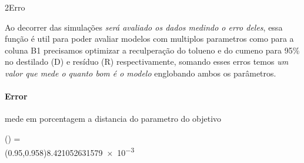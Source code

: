 \documentclass[\mainfilename]{subfiles}
\begin{document}
\begin{sectionBox}2{Erro} %
    
    Ao decorrer das simulações \emph{será avaliado os dados medindo o erro deles}, essa função é util para poder avaliar modelos com multiplos parametros como para a coluna B1 precisamos optimizar a reculperação do tolueno e do cumeno para 95\% no destilado (D) e resíduo (R) respectivamente, somando esses erros temos \emph{um valor que mede o quanto bom é o modelo} englobando ambos os parâmetros.


    \paragraph*{Error} mede em porcentagem a distancia do parametro do objetivo
    \begin{BM}
        ()
        = 
        \\
        (0.95,0.958)\cong\num{8.421052631579e-3}
    \end{BM}
    
\end{sectionBox}
\end{document}
